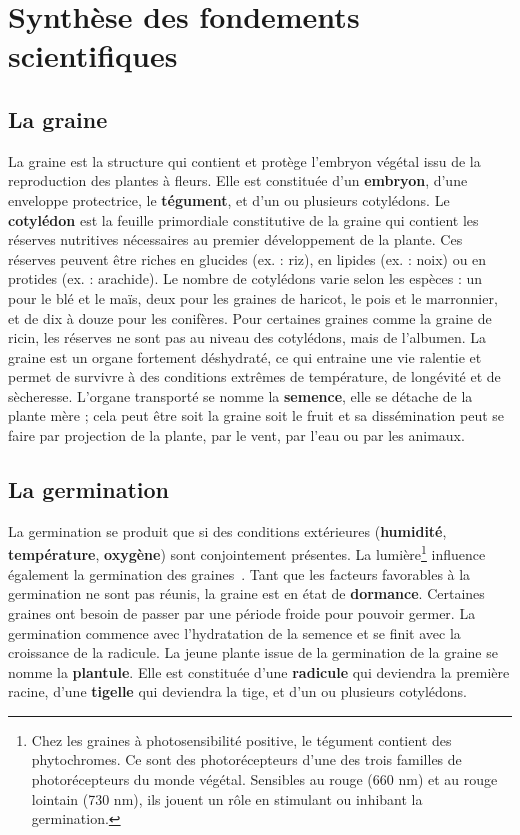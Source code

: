 \section{Synthèse des fondements scientifiques}
\subsection{La graine}
La graine est la structure qui contient et protège l’embryon végétal issu de la reproduction des plantes à fleurs. Elle est constituée d’un \textbf{embryon}, d’une enveloppe protectrice, le \textbf{tégument}, et d’un ou plusieurs cotylédons. Le \textbf{cotylédon} est la feuille primordiale constitutive de la graine qui contient les réserves nutritives nécessaires au premier développement de la plante. Ces réserves peuvent être riches en glucides (ex. : riz), en lipides (ex. : noix) ou en protides (ex. : arachide). Le nombre de cotylédons varie selon les espèces : un pour le blé et le maïs, deux pour les graines de haricot, le pois et le marronnier, et de dix à douze pour les conifères. Pour certaines graines comme la graine de ricin, les réserves ne sont pas au niveau des cotylédons, mais de l’albumen. La graine est un organe fortement déshydraté, ce qui entraine une vie ralentie et permet de survivre à des conditions extrêmes de température, de longévité et de sècheresse. L’organe transporté se nomme la \textbf{semence}, elle se détache de la plante mère ; cela peut être soit la graine soit le fruit et sa dissémination peut se faire par projection de la plante, par le vent, par l’eau ou par les animaux.

\subsection{La germination}
La germination se produit que si des conditions extérieures (\textbf{humidité}, \textbf{température}, \textbf{oxygène}) sont conjointement présentes. La lumière\footnote{Chez les graines à photosensibilité positive, le tégument contient des phytochromes. Ce sont des photorécepteurs d’une des trois familles de photorécepteurs du monde végétal. Sensibles au rouge (660 nm) et au rouge lointain (730 nm), ils jouent un rôle en stimulant ou inhibant la germination.} influence également la germination des graines~\cite[p.~374]{Hopkins2003}. %
Tant que les facteurs favorables à la germination ne sont pas réunis, la graine est en état de \textbf{dormance}. Certaines graines ont besoin de passer par une période froide pour pouvoir germer. La germination commence avec l’hydratation de la semence et se finit avec la croissance de la radicule. La jeune plante issue de la germination de la graine se nomme la \textbf{plantule}. Elle est constituée d’une \textbf{radicule} qui deviendra la première racine, d’une \textbf{tigelle} qui deviendra la tige, et d’un ou plusieurs cotylédons.

